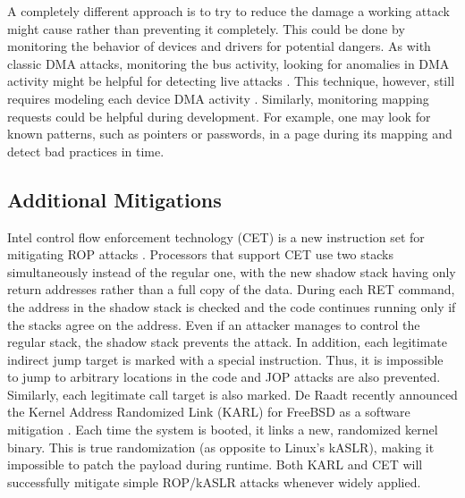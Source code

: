 A completely different approach is to try to reduce the damage a working attack might cause rather than preventing it completely. This could be done by monitoring the behavior of devices and drivers for potential dangers. As with classic DMA attacks, monitoring the bus activity, looking for anomalies in DMA activity might be helpful for detecting live attacks \cite{Ste13}. This technique, however, still requires modeling each device DMA activity \cite{Ste14}. Similarly, monitoring mapping requests could be helpful during development. For example, one may look for known patterns, such as pointers or passwords, in a page during its mapping and detect bad practices in time.
\subsection{Additional Mitigations}
Intel control flow enforcement technology (CET) is a new instruction set for mitigating ROP attacks \cite{Int17}. Processors that support CET use two stacks simultaneously instead of the regular one, with the new shadow stack having only return addresses rather than a full copy of the data. During each RET command, the address in the shadow stack is checked and the code continues running only if the stacks agree on the address. Even if an attacker manages to control the regular stack, the shadow stack prevents the attack. In addition, each legitimate indirect jump target is marked with a special instruction. Thus, it is impossible to jump to arbitrary locations in the code and JOP attacks are also prevented. Similarly, each legitimate call target is also marked. De Raadt recently announced the Kernel Address Randomized Link (KARL) for FreeBSD as a software mitigation \cite{dr17}. Each time the system is booted, it links a new, randomized kernel binary. This is true randomization (as opposite to Linux’s kASLR), making it impossible to patch the payload during runtime. Both KARL and CET will successfully mitigate simple ROP/kASLR attacks whenever widely applied. 
